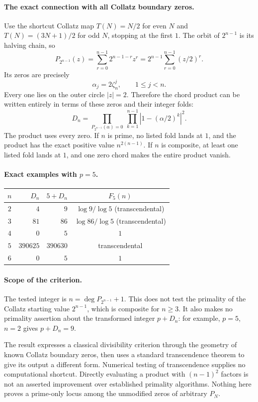 \documentclass[11pt,a4paper]{article}
\theoremstyle{definition}
\theoremstyle{remark}
\numberwithin{equation}{section}
\begin{document}
\paragraph{The exact connection with all Collatz boundary zeros.}
Use the shortcut Collatz map $T(N)=N/2$ for even $N$ and
$T(N)=(3N+1)/2$ for odd $N$, stopping at the first $1$. The orbit of
$2^{n-1}$ is its halving chain, so
\[
 P_{2^{n-1}}(z)=\sum_{r=0}^{n-1}2^{n-1-r}z^r
 =2^{n-1}\sum_{r=0}^{n-1}(z/2)^r.
\]
Its zeros are precisely
\[
 \alpha_j=2\zeta_n^j,\qquad 1\le j<n.
\]
Every one lies on the outer circle $|z|=2$. Therefore the chord product
can be written entirely in terms of these zeros and their integer folds:
\[
 \boxed{D_n=
 \prod_{P_{2^{n-1}}(\alpha)=0}\ 
 \prod_{k=1}^{n-1}\left|1-(\alpha/2)^k\right|^2.}
\]
The product uses every zero. If $n$ is prime, no listed fold lands at
$1$, and the product has the exact positive value $n^{2(n-1)}$.
If $n$ is composite, at least one listed fold lands at $1$, and one
zero chord makes the entire product vanish.

\paragraph{Exact examples with $p=5$.}
\begin{center}
\begin{tabular}{c r r c}
$n$ & $D_n$ & $5+D_n$ & $F_5(n)$\\\hline
$2$ & $4$ & $9$ & $\log 9/\log 5$ (transcendental)\\
$3$ & $81$ & $86$ & $\log 86/\log 5$ (transcendental)\\
$4$ & $0$ & $5$ & $1$\\
$5$ & $390625$ & $390630$ & transcendental\\
$6$ & $0$ & $5$ & $1$
\end{tabular}
\end{center}

\paragraph{Scope of the criterion.}
The tested integer is $n=\deg P_{2^{n-1}}+1$. This does not test the
primality of the Collatz starting value $2^{n-1}$, which is composite
for $n\ge3$. It also makes no primality assertion about the transformed
integer $p+D_n$: for example, $p=5$, $n=2$ gives $p+D_n=9$.

The result expresses a classical divisibility criterion through the
geometry of known Collatz boundary zeros, then uses a standard
transcendence theorem to give its output a different form. Numerical
testing of transcendence supplies no computational shortcut. Directly
evaluating a product with $(n-1)^2$ factors is not an asserted
improvement over established primality algorithms. Nothing here proves
a prime-only locus among the unmodified zeros of arbitrary $P_N$.
\end{document}
